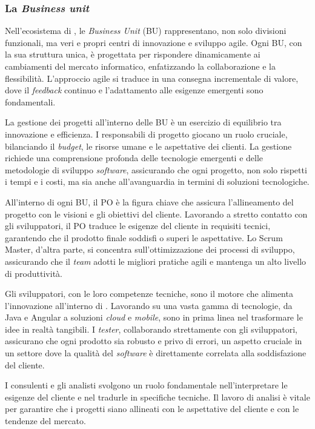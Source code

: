  \subsubsection{\textbf{La \textit{Business unit}}}

 \noindent Nell'ecosistema di \azienda{}, le \textit{Business Unit} (BU) rappresentano, non solo divisioni funzionali, ma veri e propri centri di innovazione e sviluppo agile. 
 Ogni BU, con la sua struttura unica, è progettata per rispondere dinamicamente ai cambiamenti del mercato informatico, enfatizzando la collaborazione e la flessibilità. 
 L'approccio agile si traduce in una consegna incrementale di valore, dove il \textit{feedback} continuo e l'adattamento alle esigenze emergenti sono fondamentali.
 
 \noindent La gestione dei progetti all'interno delle BU è un esercizio di equilibrio tra innovazione e efficienza. I responsabili di progetto giocano un ruolo cruciale, 
 bilanciando il \textit{budget}, le risorse umane e le aspettative dei clienti. 
 La gestione richiede una comprensione profonda delle tecnologie emergenti e delle metodologie di sviluppo \textit{software}, 
 assicurando che ogni progetto, non solo rispetti i tempi e i costi, ma sia anche all'avanguardia in termini di soluzioni tecnologiche.
 
 \noindent All'interno di ogni BU, il \gls{PO} è la figura chiave che assicura l'allineamento del progetto con le visioni e gli obiettivi del cliente. 
 Lavorando a stretto contatto con gli sviluppatori, il PO traduce le esigenze del cliente in requisiti tecnici, garantendo che il prodotto finale soddisfi o superi le aspettative. 
 Lo \gls{Scrum Master}, d'altra parte, si concentra sull'ottimizzazione dei processi di sviluppo, assicurando che il \textit{team} adotti le migliori pratiche agili e mantenga un alto 
 livello di produttività.
 
 \noindent Gli sviluppatori, con le loro competenze tecniche, sono il motore che alimenta l'innovazione all'interno di \azienda. 
 Lavorando su una vasta gamma di tecnologie, da Java e Angular a soluzioni \textit{cloud} e \textit{mobile}, sono in prima linea nel trasformare le idee in realtà tangibili. 
 I \textit{tester}, collaborando strettamente con gli sviluppatori, assicurano che ogni prodotto sia robusto e privo di errori, un aspetto cruciale in un settore dove 
 la qualità del \textit{software} è direttamente correlata alla soddisfazione del cliente.
 
 \noindent I consulenti e gli \gls{analisti} svolgono un ruolo fondamentale nell'interpretare le esigenze del cliente e nel tradurle in specifiche tecniche. 
 Il lavoro di analisi è vitale per garantire che i progetti siano allineati con le aspettative del cliente e con le tendenze del mercato.
 
